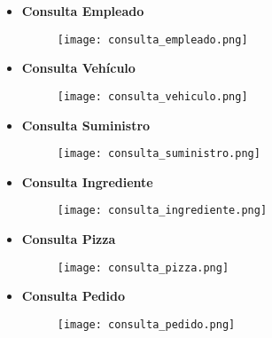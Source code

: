 \documentclass[a4paper]{article}
\begin{document}
\begin{itemize}

    \item \textbf{\large{Consulta Empleado}}
    
    \begin{figure}[H]
        \centering
        \texttt{[image: consulta\_empleado.png]}
        \label{fig:consulta_empleado}
    \end{figure}

\newpage
    
    \item \textbf{\large{Consulta Vehículo}}

    \begin{figure}[H]
        \centering
        \texttt{[image: consulta\_vehiculo.png]}
        \label{fig:consulta_vehiculo}
    \end{figure}

    \item \textbf{\large{Consulta Suministro}}

    \begin{figure}[H]
        \centering
        \texttt{[image: consulta\_suministro.png]}
        \label{fig:consulta_suministro}
    \end{figure}

    \item \textbf{\large{Consulta Ingrediente}}

    \begin{figure}[H]
        \centering
        \texttt{[image: consulta\_ingrediente.png]}
        \label{fig:consulta_ingrediente}
    \end{figure}

    \item \textbf{\large{Consulta Pizza}}

    \begin{figure}[H]
        \centering
        \texttt{[image: consulta\_pizza.png]}
        \label{fig:consulta_pizza}
    \end{figure}

    \item \textbf{\large{Consulta Pedido}}

    \begin{figure}[H]
        \centering
        \texttt{[image: consulta\_pedido.png]}
        \label{fig:consulta_pedido}
    \end{figure}

\newpage


\end{itemize}
\end{document}

